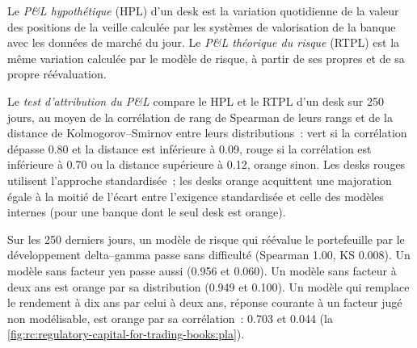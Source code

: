 \begin{definition}\label{def:rc:regulatory-capital-for-trading-books:hpl}
Le \emph{P\&L hypothétique} (HPL) d'un desk est la variation quotidienne de la
valeur des positions de la veille calculée par les systèmes de valorisation de la banque avec les données de marché du jour.
Le \emph{P\&L théorique du risque} (RTPL) est la même variation calculée par
le modèle de risque, à partir de ses propres  et de sa propre réévaluation.
\end{definition}

\begin{definition}\label{def:rc:regulatory-capital-for-trading-books:pla}
Le \emph{test d'attribution du P\&L} compare le HPL et le RTPL d'un desk sur
250 jours, au moyen de la corrélation de rang de Spearman de leurs rangs et de la distance de Kolmogorov--Smirnov entre
leurs distributions~: vert si la corrélation dépasse 0.80 et la distance est inférieure à 0.09, rouge si
la corrélation est inférieure à 0.70 ou la distance supérieure à 0.12, orange sinon. Les desks rouges utilisent
l'approche standardisée~; les desks orange acquittent une majoration égale à la moitié de l'écart entre l'exigence standardisée et
celle des modèles internes (pour une banque dont le seul desk est orange).
\end{definition}

\label{lst:rc:regulatory-capital-for-trading-books:pla}

\begin{example}\label{ex:rc:regulatory-capital-for-trading-books:pla}
Sur les 250 derniers jours, un modèle de risque qui réévalue le portefeuille par le développement delta--gamma
passe sans difficulté (Spearman 1.00, KS 0.008). Un modèle sans facteur yen passe aussi (0.956 et 0.060).
Un modèle sans facteur à deux ans est orange par sa distribution (0.949 et 0.100). Un modèle qui
remplace le rendement à dix ans par celui à deux ans, réponse courante à un facteur jugé non modélisable,
est orange par sa corrélation~: 0.703 et 0.044 (la \cref{fig:rc:regulatory-capital-for-trading-books:pla}).
\end{example}

